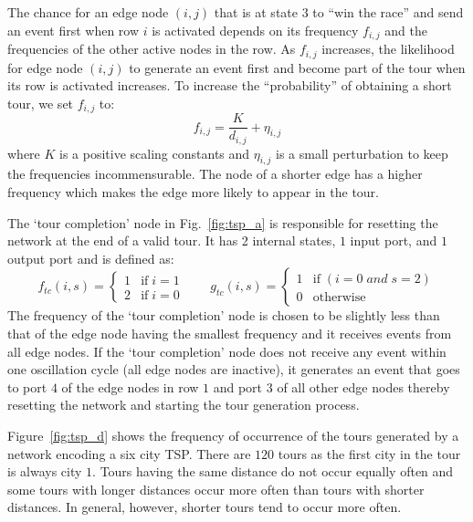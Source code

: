 \documentclass[10pt]{article}
\begin{document}
The chance for an edge node $(i,j)$ that is at state $3$ to ``win the race'' and send an event first when row $i$ is activated depends on its frequency $f_{i,j}$  and the frequencies of the other active nodes in the row. As $f_{i,j}$ increases, the likelihood for edge node $(i,j)$ to generate an event first and become part of the tour when its row is activated increases. To increase the ``probability'' of obtaining a short tour, we set $f_{i,j}$ to:
\begin{equation*}
f_{i,j} = \frac{K}{d_{i,j}} + \eta_{i,j}
\end{equation*}
where $K$ is a positive scaling constants and $\eta_{i,j}$ is a small perturbation to keep the frequencies incommensurable. The node of a shorter edge has a higher frequency which makes the edge more likely to appear in the tour. 

The `tour completion' node in Fig.~\ref{fig:tsp_a} is responsible for resetting the network at the end of a valid tour. It has 2 internal states, $1$ input port, and $1$ output port and is defined as: 
\begin{equation*}
  f_{tc}(i,s) =
  \begin{cases}
    1 & \text{if}\; i=1 \\
    2 & \text{if}\; i=0
  \end{cases}
  \quad\quad
  g_{tc}(i,s) =
  \begin{cases}
    1 & \text{if}\; (i=0 \; and \; s=2) \\
    0 & \text{otherwise} 
  \end{cases}
\end{equation*}
The frequency of the `tour completion' node is chosen to be slightly less than that of the edge node having the smallest frequency and it receives events from all edge nodes. If the `tour completion' node does not receive any event within one oscillation cycle (all edge nodes are inactive), it generates an event that goes to port $4$ of the edge nodes in row $1$ and port $3$ of all other edge nodes thereby resetting the network and starting the tour generation process. 

Figure~\ref{fig:tsp_d} shows the frequency of occurrence of the tours generated by a network encoding a six city TSP. There are $120$ tours as the first city in the tour is always city $1$. Tours having the same distance do not occur equally often and some tours with longer distances occur more often than tours with shorter distances. In general, however, shorter tours tend to occur more often. 
\end{document}
